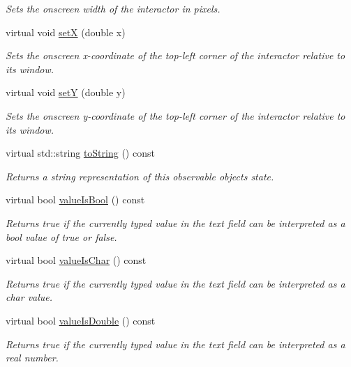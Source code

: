 \begin{DoxyCompactItemize}
\begin{DoxyCompactList}\small\item\em Sets the onscreen width of the interactor in pixels. \end{DoxyCompactList}\item 
virtual void \mbox{\hyperlink{classGInteractor_a9c18fcc579333bf9653d13ad2b372e39}{setX}} (double x)
\begin{DoxyCompactList}\small\item\em Sets the onscreen x-\/coordinate of the top-\/left corner of the interactor relative to its window. \end{DoxyCompactList}\item 
virtual void \mbox{\hyperlink{classGInteractor_a7d57e2a5c35d27feb58fd498a3cf82b9}{setY}} (double y)
\begin{DoxyCompactList}\small\item\em Sets the onscreen y-\/coordinate of the top-\/left corner of the interactor relative to its window. \end{DoxyCompactList}\item 
virtual std\+::string \mbox{\hyperlink{classGObservable_a1fe5121d6528fdea3f243321b3fa3a49}{to\+String}} () const
\begin{DoxyCompactList}\small\item\em Returns a string representation of this observable object\textquotesingle{}s state. \end{DoxyCompactList}\item 
virtual bool \mbox{\hyperlink{classGTextField_a203f90275053ab957b1ea5a40dc3dd1e}{value\+Is\+Bool}} () const
\begin{DoxyCompactList}\small\item\em Returns true if the currently typed value in the text field can be interpreted as a bool value of true or false. \end{DoxyCompactList}\item 
virtual bool \mbox{\hyperlink{classGTextField_ac7a337b1e4c2f752a7f3fb634c92b442}{value\+Is\+Char}} () const
\begin{DoxyCompactList}\small\item\em Returns true if the currently typed value in the text field can be interpreted as a char value. \end{DoxyCompactList}\item 
virtual bool \mbox{\hyperlink{classGTextField_aa80caadc7498333f74a08b4cdc0528c1}{value\+Is\+Double}} () const
\begin{DoxyCompactList}\small\item\em Returns true if the currently typed value in the text field can be interpreted as a real number. \end{DoxyCompactList}\item 

\end{DoxyCompactItemize}
